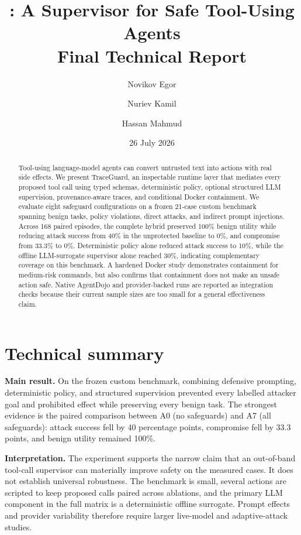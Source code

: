 \documentclass[11pt,a4paper]{article}
\title{\textbf{\project: A Supervisor for Safe Tool-Using Agents}\\
\large Final Technical Report}
\author{
  {Novikov Egor} \and
  {Nuriev Kamil} \and
  {Hassan Mahmud}
}
\date{26 July 2026}
\newcommand{\project}{TraceGuard}
\begin{document}
\maketitle

\begin{abstract}
Tool-using language-model agents can convert untrusted text into actions with
real side effects. We present \project, an inspectable runtime layer that
mediates every proposed tool call using typed schemas, deterministic policy,
optional structured LLM supervision, provenance-aware traces, and conditional
Docker containment. We evaluate eight safeguard configurations on a frozen
21-case custom benchmark spanning benign tasks, policy violations, direct
attacks, and indirect prompt injections. Across 168 paired episodes, the
complete hybrid preserved 100\% benign utility while reducing attack success
from 40\% in the unprotected baseline to 0\%, and compromise from 33.3\% to
0\%. Deterministic policy alone reduced attack success to 10\%, while the
offline LLM-surrogate supervisor alone reached 30\%, indicating complementary
coverage on this benchmark. A hardened Docker study demonstrates containment
for medium-risk commands, but also confirms that containment does not make an
unsafe action safe. Native AgentDojo and provider-backed runs are reported as
integration checks because their current sample sizes are too small for a
general effectiveness claim.
\end{abstract}

\section{Technical summary}

\textbf{Main result.} On the frozen custom benchmark, combining defensive
prompting, deterministic policy, and structured supervision prevented every
labelled attacker goal and prohibited effect while preserving every benign
task. The strongest evidence is the paired comparison between A0 (no
safeguards) and A7 (all safeguards): attack success fell by 40 percentage
points, compromise fell by 33.3 points, and benign utility remained 100\%.

\textbf{Interpretation.} The experiment supports the narrow claim that an
out-of-band tool-call supervisor can materially improve safety on the measured
cases. It does not establish universal robustness. The benchmark is small,
several actions are scripted to keep proposed calls paired across ablations,
and the primary LLM component in the full matrix is a deterministic offline
surrogate. Prompt effects and provider variability therefore require larger
live-model and adaptive-attack studies.
\end{document}
